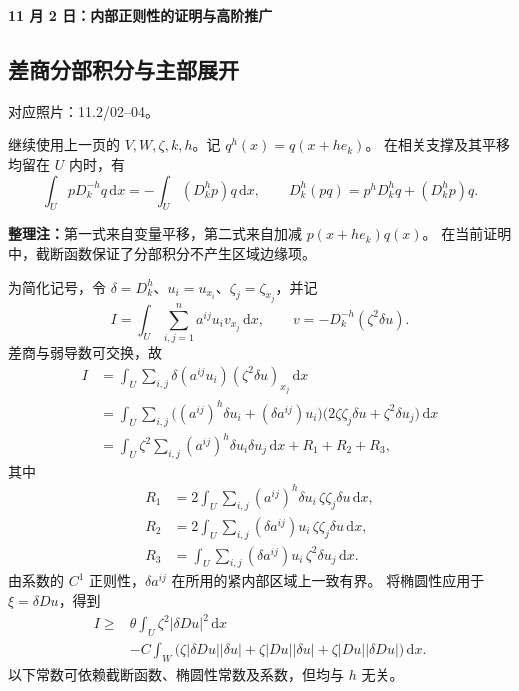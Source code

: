 \documentclass[UTF8,a4paper,11pt,fontset=fandol]{ctexart}
\newcommand{\dd}{\,\mathrm d}
\newcommand{\ednote}[1]{\par{\small\color{notegray}\textbf{整理注：}#1}\par}
\newcommand{\source}[1]{{\small\color{notegray}对应照片：#1。}\par}
\begin{document}
\newpage
{}
\begin{center}
  {\Large\bfseries 11 月 2 日：内部正则性的证明与高阶推广}
\end{center}
\subsection{差商分部积分与主部展开}
\source{11.2/02--04}
继续使用上一页的 $V,W,\zeta,k,h$。记 $q^h(x)=q(x+he_k)$。
在相关支撑及其平移均留在 $U$ 内时，有
\[
\boxed{\int_U pD_k^{-h}q\dd x=-\int_U(D_k^h p)q\dd x,}
\qquad
\boxed{D_k^h(pq)=p^hD_k^h q+(D_k^h p)q.}
\]
\ednote{第一式来自变量平移，第二式来自加减 $p(x+he_k)q(x)$。
在当前证明中，截断函数保证了分部积分不产生区域边缘项。}
为简化记号，令 $\delta=D_k^h$、$u_i=u_{x_i}$、$\zeta_j=\zeta_{x_j}$，并记
\[
I=\int_U\sum_{i,j=1}^n a^{ij}u_i v_{x_j}\dd x,
\qquad v=-D_k^{-h}(\zeta^2\delta u).
\]
差商与弱导数可交换，故
\[
\begin{aligned}
I&=\int_U\sum_{i,j}\delta(a^{ij}u_i)(\zeta^2\delta u)_{x_j}\dd x\\
 &=\int_U\sum_{i,j}
 \bigl((a^{ij})^h\delta u_i+(\delta a^{ij})u_i\bigr)
 \bigl(2\zeta\zeta_j\delta u+\zeta^2\delta u_j\bigr)\dd x\\
 &=\int_U\zeta^2\sum_{i,j}(a^{ij})^h\delta u_i\delta u_j\dd x+R_1+R_2+R_3,
\end{aligned}
\]
其中
\[
\begin{aligned}
R_1&=2\int_U\sum_{i,j}(a^{ij})^h\delta u_i\,\zeta\zeta_j\delta u\dd x,\\
R_2&=2\int_U\sum_{i,j}(\delta a^{ij})u_i\,\zeta\zeta_j\delta u\dd x,\\
R_3&=\int_U\sum_{i,j}(\delta a^{ij})u_i\,\zeta^2\delta u_j\dd x.
\end{aligned}
\]
由系数的 $C^1$ 正则性，$\delta a^{ij}$ 在所用的紧内部区域上一致有界。
将椭圆性应用于 $\xi=\delta Du$，得到
\[
\begin{aligned}
I\geq{}&\theta\int_U\zeta^2|\delta Du|^2\dd x\\
&-C\int_W\bigl(\zeta|\delta Du||\delta u|
 +\zeta|Du||\delta u|+\zeta|Du||\delta Du|\bigr)\dd x.
\end{aligned}
\]
以下常数可依赖截断函数、椭圆性常数及系数，但均与 $h$ 无关。

\newpage
\end{document}

